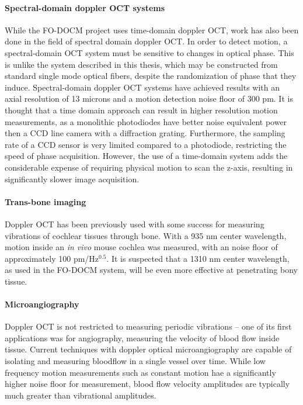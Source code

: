 \paragraph{Spectral-domain doppler OCT systems} While the FO-DOCM project uses time-domain doppler OCT, work has also been done in the field of spectral domain doppler OCT.  In order to detect motion, a spectral-domain OCT system must be sensitive to changes in optical phase. This is unlike the system described in this thesis, which may be constructed from standard single mode optical fibers, despite the randomization of phase that they induce. Spectral-domain doppler OCT systems have achieved results with an axial resolution of 13 microns and a motion detection noise floor of 300 pm. It is thought that a time domain approach can result in higher resolution motion measurements, as a monolithic photodiodes have better noise equivalent power then a CCD line camera with a diffraction grating. Furthermore, the sampling rate of a CCD sensor is very limited compared to a photodiode, restricting the speed of phase acquisition. However, the use of a time-domain system adds the considerable expense of requiring physical motion to scan the z-axis, resulting in significantly slower image acquisition. \cite{Choudhury2011} \cite{Subhash2012}

\paragraph{Trans-bone imaging} Doppler OCT has been previously used with some success for measuring vibrations of cochlear tissues through bone. With a 935 nm center wavelength, motion inside an {\em in vivo} mouse cochlea was measured, with an noise floor of approximately 100 pm/Hz$^{0.5}$. \cite{Gao2013} It is suspected that a 1310 nm center wavelength, as used in the FO-DOCM system, will be even more effective at penetrating bony tissue. \cite{Sandell2011} \cite{Bashkatov2006}

\paragraph{Microangiography} Doppler OCT is not restricted to measuring periodic vibrations -- one of its first applications was for angiography, measuring the velocity of blood flow inside tissue. Current techniques with doppler optical microangiography are capable of isolating and measuring bloodflow in a single vessel over time. While low frequency motion measurements such as constant motion hae a significantly higher noise floor for measurement, blood flow velocity amplitudes are typically much greater than vibrational amplitudes. \cite{Dziennis2012}

